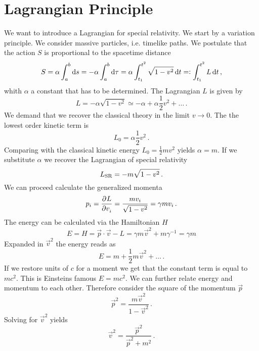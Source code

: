\section{Lagrangian Principle}
We want to introduce a Lagrangian for special relativity. We start by a
variation principle. We consider massive particles, i.e. timelike paths. We
postulate that the action $S$ is proportional to the spacetime distance 
\begin{equation}
S= \alpha \int_a^b\dif s=- \alpha \int_a^b\dif \tau = \alpha
\int_{t_1}^{t^2}\sqrt{1-v^2}\dif t =: \int_{t_1}^{t^2}L\dif t\, ,
\end{equation}
whith $\alpha$ a constant that has to be determined. The Lagrangian $L$ is
given by
\begin{equation}
L=-\alpha\sqrt{1-v^2}\simeq -\alpha +\alpha\frac{1}{2}v^2+\ldots\, .
\end{equation}
We demand that we recover the classical theory in the limit $v\to 0$. The
the lowest order kinetic term is 
\begin{equation}
L_0=\alpha\frac{1}{2}v^2\, .
\end{equation}
Comparing with the classical kinetic energy $L_0=\frac{1}{2}mv^2$ yields
$\alpha=m$. If we substitute $\alpha$ we recover the Lagrangian of special
relativity
\begin{equation}
L\textsubscript{SR}=-m\sqrt{1-v^2}\, .
\end{equation}
We can proceed calculate the generalized momenta
\begin{equation}
p_i=\dpd{L}{v_i}=\frac{mv_i}{\sqrt{1-v^2}}=\gamma m v_i\, .
\end{equation}
The energy can be calculated via the Hamiltonian $H$
\begin{equation}
E=H=\vec{p}\cdot\vec{v}-L=\gamma m \vec{v}^2 + m\gamma^{-1} =\gamma m
\end{equation}
Expanded in $\vec{v}^2$ the energy reads as
\begin{equation}
E=m+\frac{1}{2}m\vec{v}^2+\ldots\, .
\end{equation}
If we restore units of $c$ for a moment we get that the constant term is
equal to $mc^2$. This is Einsteins famous $E=mc^2$. 
We can further relate energy and momentum to each other. Therefore consider the
square of the momentum $\vec{p}$
\begin{equation}
\vec{p}^2=\frac{m\vec{v}^2}{1-\vec{v}^2}\, .
\end{equation}
Solving for $\vec{v}^2$ yields
\begin{equation}
\vec{v}^2=\frac{\vec{p}^2}{\vec{p}^2+m^2}\, .
\end{equation}

